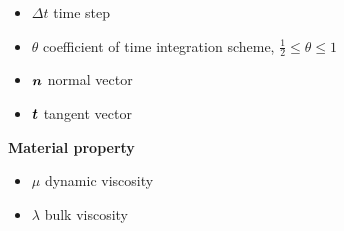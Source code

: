 \documentclass[11pt]{article}
\def\bbf#1{\mathchoice{\hbox{\boldmath$\displaystyle#1$}}
{\hbox{\boldmath$\textstyle#1$}} {\hbox{\boldmath$\scriptstyle#1$}} {\hbox{\boldmath$\scriptscriptstyle#1$}} }
\newcommand{\n}{\bbf{n}}
\renewcommand{\t}{\bbf{t}}
\newcommand{\nxi}{\frac{\partial N}{\partial \xi}}
\newcommand{\neta}{\frac{\partial N}{\partial \eta}}
\begin{document}
\begin{itemize}
	\item $\Delta t$ time step
	\item $\theta$ coefficient of time integration scheme, $\frac{1}{2} \le \theta \le 1$
	\item $\n$ normal vector
	\item $\t$ tangent vector
\end{itemize}
{\large \bf Material property} %
\begin{itemize}
\item $\mu$ dynamic viscosity
\item $\lambda$ bulk viscosity
\end{itemize}


\end{document}
